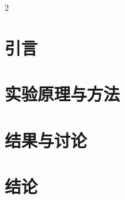 \documentclass[12pt,a4paper]{article}
\begin{document}
\vspace{1cm}

\begin{multicols}{2}

    \section*{\heiti 引言}
    \songti
    \setlength{\parindent}{2em}

    \section{\heiti 实验原理与方法}
    \subsection{\heiti }
    \songti

\subsection{\heiti }

    \subsection{\heiti }

    \section{\heiti 结果与讨论}
    \subsection{\heiti }
    \songti

      \subsection{\heiti }

\section{\heiti 结\quad 论}
    \songti

\end{multicols}

\end{document}
